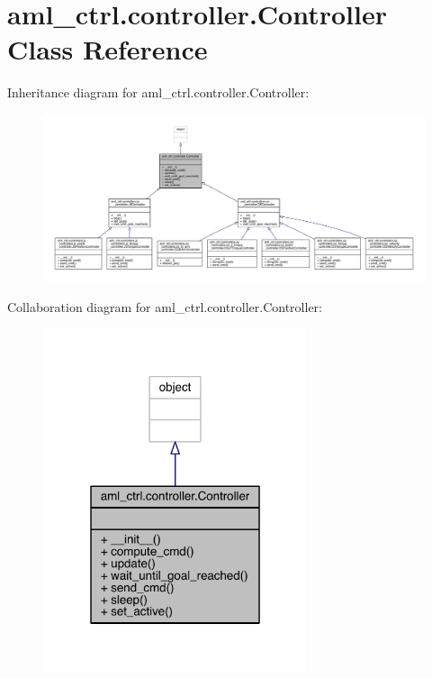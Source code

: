 \hypertarget{classaml__ctrl_1_1controller_1_1_controller}{}\section{aml\+\_\+ctrl.\+controller.\+Controller Class Reference}
\label{classaml__ctrl_1_1controller_1_1_controller}


Inheritance diagram for aml\+\_\+ctrl.\+controller.\+Controller\+:\nopagebreak
\begin{figure}[H]
\begin{center}
\leavevmode
\includegraphics[width=350pt]{classaml__ctrl_1_1controller_1_1_controller__inherit__graph}
\end{center}
\end{figure}


Collaboration diagram for aml\+\_\+ctrl.\+controller.\+Controller\+:\nopagebreak
\begin{figure}[H]
\begin{center}
\leavevmode
\includegraphics[width=220pt]{classaml__ctrl_1_1controller_1_1_controller__coll__graph}
\end{center}
\end{figure}
